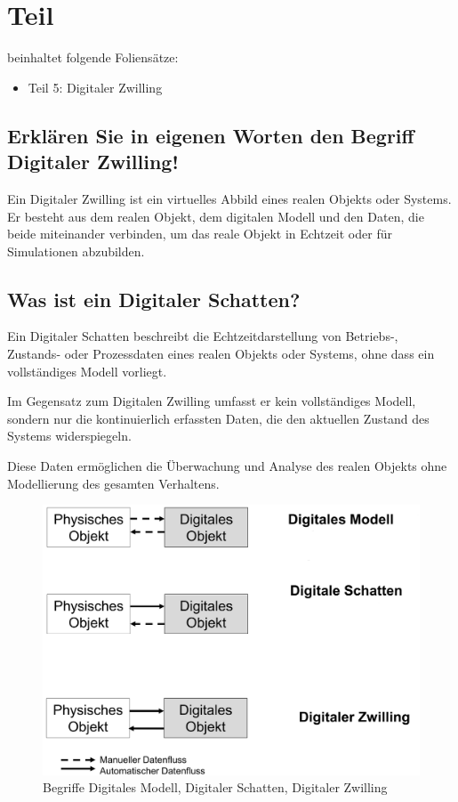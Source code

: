 \section{Teil}
beinhaltet folgende Foliensätze:

\begin{itemize}
    \item Teil 5: Digitaler Zwilling

\end{itemize}

\subsection{Erklären Sie in eigenen Worten den Begriff Digitaler Zwilling!}
Ein Digitaler Zwilling ist ein virtuelles Abbild eines realen Objekts oder Systems. 
Er besteht aus dem realen Objekt, dem digitalen Modell und den Daten, die beide miteinander verbinden, um das reale Objekt in Echtzeit oder für Simulationen abzubilden.


\subsection{Was ist ein Digitaler Schatten?}
Ein Digitaler Schatten beschreibt die Echtzeitdarstellung von Betriebs-, Zustands- oder Prozessdaten eines realen Objekts oder Systems, ohne dass ein vollständiges Modell vorliegt. 

Im Gegensatz zum Digitalen Zwilling umfasst er kein vollständiges Modell, sondern nur die kontinuierlich erfassten Daten, die den aktuellen Zustand des Systems widerspiegeln. 

Diese Daten ermöglichen die Überwachung und Analyse des realen Objekts ohne Modellierung des gesamten Verhaltens.

\begin{figure}[H]
    \centering
    \includegraphics[width=0.6\linewidth]{Bilder/Teil5_Begriffe.png}
    \caption{Begriffe Digitales Modell, Digitaler Schatten, Digitaler Zwilling}
\end{figure}

